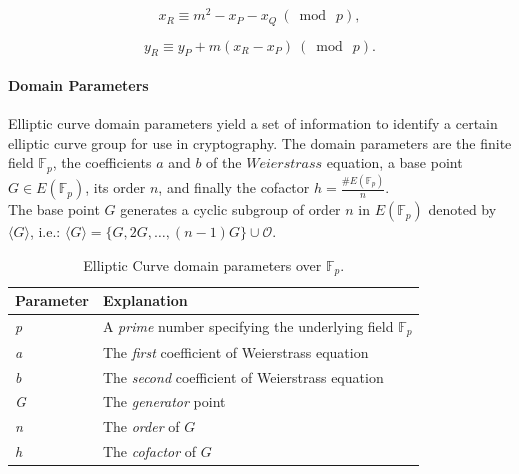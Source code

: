 \begin{equation}
x_{R}\equiv m^{2}-x_{P}-x_{Q}\ (\bmod\ p),
\end{equation}

\begin{equation}
y_{R}\equiv y_{P}+m(x_{R}-x_{P})\ (\bmod\ p).
\end{equation}

\paragraph{Domain Parameters}
Elliptic curve domain parameters yield a set of information to identify a certain elliptic curve group for use in cryptography. The domain parameters are the finite field $\mathbb{F}_{p}$, the coefficients $a$ and $b$ of the $Weierstrass$ equation, a base point $G\in E(\mathbb{F}_{p})$, its order $n$,
and finally the cofactor $h=\frac{\#E(\mathbb{F}_{p})}{n}$. \\
The base point $G$ generates a cyclic subgroup of order $n$ in $E(\mathbb{F}_{p})$ denoted by $\langle{G}\rangle$, i.e.:
$\langle{G}\rangle= \{G, 2G,\dots, (n-1)G\} \cup {\mathcal{O}}$.

\begin{table}[H]
	\centering
	\begin{tabular}{|l|l|}
		\hline
		\textbf{Parameter} & \textbf{Explanation}\\
		\hline
		\hline
		\textit{p} & A \textit{prime} number specifying the underlying field $\mathbb{F}_{p}$ \\
		\hline
		\textit{a} & The \textit{first} coefficient of Weierstrass equation \\
		\hline
		\textit{b} & The \textit{second} coefficient of Weierstrass equation \\
		\hline
		\textit{G} & The \textit{generator} point \\
		\hline
		\textit{n} & The \textit{order} of $G$ \\
		\hline
		\textit{h} & The \textit{cofactor} of $G$ \\
		\hline
	\end{tabular}
	\caption{Elliptic Curve domain parameters over $\mathbb{F}_{p}$\cite{ECC}.}
	\label{EC:dom par}
\end{table}


